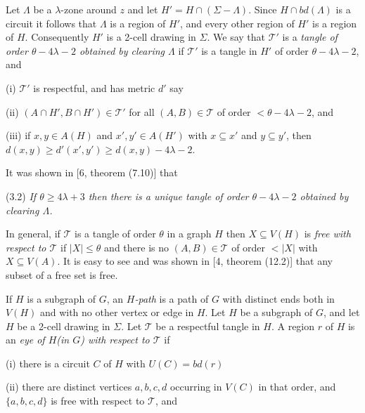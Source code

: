 Let $\Lambda$ be a $\lambda$-zone around $z$ and let $H' = H \cap (\Sigma - \Lambda)$. Since $H \cap bd(\Lambda)$ is a circuit it follows that $\Lambda$ is a region of $H'$, and every other region of $H'$ is a region of $H$. Consequently $H'$ is a 2-cell drawing in $\Sigma$. We say that $\mathscr{T}'$ is a \textit{tangle of order $\theta - 4\lambda - 2$ obtained by clearing $\Lambda$} if $\mathscr{T}'$ is a tangle in $H'$ of order $\theta - 4\lambda - 2$, and

\hspace*{12pt}(i) $\mathscr{T}'$ is respectful, and has metric $d'$ say

\hspace*{12pt}(ii) $(A \cap H', B \cap H') \in \mathscr{T}'$ for all $(A, B) \in \mathscr{T}$ of order $<\theta - 4\lambda - 2$, and

\hspace*{12pt}(iii) if $x, y \in A(H)$ and $x', y' \in A(H')$ with $x \subseteq x'$ and $y \subseteq y'$, then $d(x, y) \ge d'(x', y') \ge d(x, y) - 4\lambda - 2$.

It was shown in [6, theorem (7.10)] that

\stmt
(3.2) \textit{If $\theta \ge 4\lambda + 3$ then there is a unique tangle of order $\theta - 4\lambda - 2$ obtained by clearing $\Lambda$.}

In general, if $\mathscr{T}$ is a tangle of order $\theta$ in a graph $H$ then $X \subseteq V(H)$ is \textit{free with respect to $\mathscr{T}$} if $|X| \le \theta$ and there is no $(A, B) \in \mathscr{T}$ of order $<|X|$ with $X \subseteq V(A)$. It is easy to see and was shown in [4, theorem (12.2)] that any subset of a free set is free.

If $H$ is a subgraph of $G$, an \textit{$H$-path} is a path of $G$ with distinct ends both in $V(H)$ and with no other vertex or edge in $H$. Let $H$ be a subgraph of $G$, and let $H$ be a 2-cell drawing in $\Sigma$. Let $\mathscr{T}$ be a respectful tangle in $H$. A region $r$ of $H$ is an \textit{eye of $H$(in $G$) with respect to $\mathscr{T}$} if

\hspace*{12pt}(i) there is a circuit $C$ of $H$ with $U(C) = bd(r)$

\hspace*{12pt}(ii) there are distinct vertices $a, b, c, d$ occurring in $V(C)$ in that order, and $\{a, b, c, d\}$ is free with respect to $\mathscr{T}$, and

